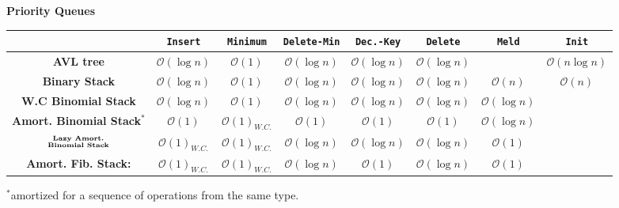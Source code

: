 \documentclass[]{article}
\newcommand\oc    {\mathcal{O}}
\newcommand\logn      {\log n}
\theoremstyle{definition}
\newcommand\regFont   {\fontsize{8}{10}\rmfamily}
\newcommand\tableFont {\fontsize{6}{7}\rmfamily}
\begin{document}
\begin{multicols}{2}
		{\regFont\hfil \textbf{Priority Queues}\vspace{-3pt}}\tableFont 
		\begin{center}\begin{tabular}{c|c|c|c|c|c|c|c}
				& \textbf{\texttt{Insert}} & \textbf{\texttt{Minimum}} & \textbf{\texttt{Delete-Min}} & \textbf{\texttt{Dec.-Key}} & \textbf{\texttt{Delete}} & \textbf{\texttt{Meld}} & \textbf{\texttt{Init}} \\
				\hline
				\textbf{AVL tree} & $\oc(\logn) $ & $\oc(1)$ & $\oc(\logn)$ & $\oc(\logn)$ & $\oc(\logn)$ & & $\oc(n \logn)$ \\
				\textbf{Binary Stack} & $\oc(\logn)$ & $\oc(1)$ & $\oc(\logn)$ & $\oc(\logn)$ & $\oc(\logn)$ & $\oc(n)$ & $\oc(n)$ \\
				\textbf{W.C Binomial Stack} & $\oc(\logn)$ & $\oc(1)$ & $\oc(\logn)$ & $\oc(\logn)$ & $\oc(\logn)$ & $\oc(\logn)$& \\
				\textbf{Amort. Binomial Stack$^{*}$} & $\oc(1)$ & $\oc(1)_{W.C.}$ & $\oc(1)$ & $\oc(1)$ & $\oc(1)$ & $\oc(\logn)$& \\ %
				$\overset{\text{\tableFont \textbf{Lazy Amort.}}}{\text{\tableFont \textbf{Binomial Stack}}}$
				& $\oc(1)_{W.C.}$ & $ \oc(1)_{W.C.} $ & $\oc(\logn)$ & $\oc(\logn)$ & $\oc(\logn)$ & $\oc(1)$ & \\ %
				\textbf{Amort. Fib. Stack: }& $\oc(1)_{W.C.}$ & $ \oc(1)_{W.C.} $ & $\oc(\logn)$ & $\oc(1)$ & $\oc(\logn)$ & $\oc(1)$ & \\
			\end{tabular}\end{center}
			$^{*}$amortized for a sequence of operations from the same type. 
	\end{multicols}
	
	
\end{document}
